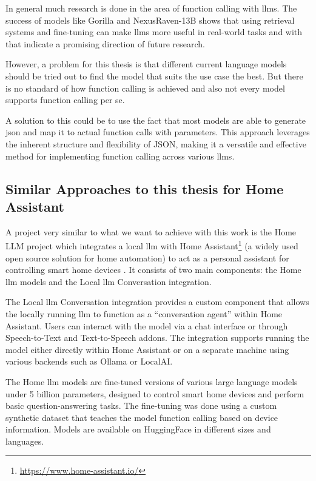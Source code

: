 In general much research is done in the area of function calling with \glspl{llm}.
The success of models like Gorilla and NexusRaven-13B shows that using retrieval systems and fine-tuning can make \glspl{llm} more useful in real-world tasks and with that indicate a promising direction of future research.

However, a problem for this thesis is that different current language models should be tried out to find the model that suits the use case the best. But there is no standard of how function calling is achieved and also not every model supports function calling per se.

A solution to this could be to use the fact that most models are able to generate \gls{json} and map it to actual function calls with parameters. This approach leverages the inherent structure and flexibility of JSON, making it a versatile and effective method for implementing function calling across various \glspl{llm}.

\subsection{Similar Approaches to this thesis for Home Assistant}
A project very similar to what we want to achieve with this work is the Home LLM project which integrates a local \gls{llm} with Home Assistant\footnote{\url{https://www.home-assistant.io/}} (a widely used open source solution for home automation) to act as a personal assistant for controlling smart home devices \cite{acon96_home_llm}. It consists of two main components: the Home \gls{llm} models and the Local \gls{llm} Conversation integration.

The Local \gls{llm} Conversation integration provides a custom component that allows the locally running \gls{llm} to function as a ``conversation agent'' within Home Assistant. Users can interact with the model via a chat interface or through Speech-to-Text and Text-to-Speech addons. The integration supports running the model either directly within Home Assistant or on a separate machine using various backends such as Ollama or LocalAI.

The Home \gls{llm} models are fine-tuned versions of various large language models under 5 billion parameters, designed to control smart home devices and perform basic question-answering tasks. The fine-tuning was done using a custom synthetic dataset that teaches the model function calling based on device information. Models are available on HuggingFace in different sizes and languages.

